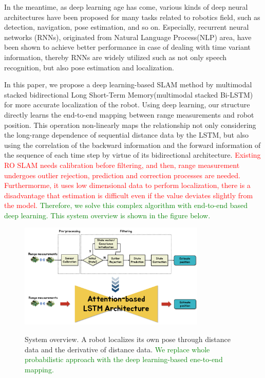 \documentclass[letterpaper, 10 pt, conference]{ieeeconf}  %
\begin{document}
 In the meantime, as deep learning age has come\cite{lecun2015deep}, various kinds of deep neural architectures have been proposed for many tasks related to robotics field, such as detection\cite{lenz2015deep,cai2016unified, smith2018object}, navigation\cite{zhu2017target, hamandi2018deepmotion}, pose estimation\cite{walch2017image}, and so on. Especially, recurrent neural networks (RNNs), originated from Natural Language Process(NLP) area\cite{elman1990finding}, have been shown to achieve better performance in case of dealing with time variant information, thereby RNNs are widely utilized such as not only speech recognition, but also pose estimation and localization\cite{walch2017image, gladh2016deep, wang2017deepvo, kendall2015posenet, turan2018deep}. 
 
 In this paper, we propose a deep learning-based SLAM method by multimodal stacked bidirectional Long Short-Term Memory(multimodal stacked Bi-LSTM) for more accurate localization of the robot. Using deep learning, our structure directly learns the end-to-end mapping between range measurements and robot position. This operation non-linearly maps the relationship not only considering the long-range dependence of sequential distance data by the LSTM, but also using the correlation of the backward information and the forward information of the sequence of each time step by virtue of its bidirectional architecture. \textcolor{red}{Existing RO SLAM needs calibration before filtering, and then, range measurement undergoes outlier rejection, prediction and correction processes are needed.	Furthermorme, it uses low dimensional data to perform localization, there is a disadvantage that estimation is difficult even if the value deviates slightly from the model.} \textcolor{green}{Therefore, we solve this complex algorithm with end-to-end based deep learning. This system overview is shown in the figure below.}
 
\begin{figure}[h]
	
	\centering
	\includegraphics[height=5cm]{CE554_traditional_to_RNN}
	\label{fig:example222}
	\caption{System overview. A robot localizes its own pose through distance data and the derivative of distance data. \textcolor{green}{We replace whole probabilistic approach with the deep learning-based ene-to-end mapping.}}
	
\end{figure}
\end{document}
